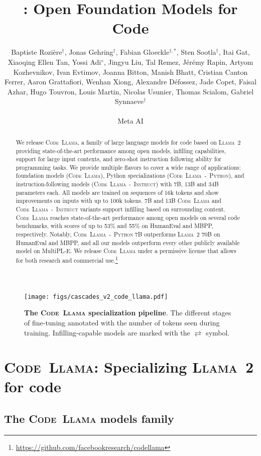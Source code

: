 \documentclass[10pt]{article}
\title{\model: Open Foundation Models for Code}
\author{\name Baptiste Rozi\`{e}re$^\dagger$,
Jonas Gehring$^\dagger$,
Fabian Gloeckle$^{\dagger,\ast}$, 
Sten Sootla$^\dagger$, 
Itai Gat, 
Xiaoqing Ellen Tan, 
Yossi Adi$^{\diamond}$, 
Jingyu Liu, 
Tal Remez, 
J\'{e}r\'{e}my Rapin,
Artyom Kozhevnikov, 
Ivan Evtimov, 
Joanna Bitton,
Manish Bhatt,
Cristian Canton Ferrer,
Aaron Grattafiori,
Wenhan Xiong, 
Alexandre D\'{e}fossez,
Jade Copet,
Faisal Azhar,
Hugo Touvron, 
Louis Martin, 
Nicolas Usunier,
Thomas Scialom,
Gabriel Synnaeve$^\dagger$
\\ \\
\hspace*{0pt}\hfill Meta AI
}
\newcommand{\model}{\textsc{Code~Llama}\xspace}
\newcommand{\basemodel}{\textsc{Code~Llama}\xspace}
\newcommand{\instmodel}{\textsc{Code~Llama~-~Instruct}\xspace}
\newcommand{\pymodel}{\textsc{Code~Llama~-~Python}\xspace}
\newcommand{\llamavtwo}{\textsc{Llama~2}\xspace}
\begin{document}
\maketitle

\begin{abstract}

We release \model, a family of large language models for code based on \llamavtwo providing state-of-the-art performance among open models, infilling capabilities, support for large input contexts, and zero-shot instruction following ability for programming tasks.
We provide multiple flavors to cover a wide range of applications: foundation models (\basemodel), Python specializations (\pymodel), and instruction-following models (\instmodel) with 7B, 13B and 34B parameters each.
All models are trained on sequences of 16k tokens and show improvements on inputs with up to 100k tokens.
7B and 13B \basemodel and \instmodel variants support infilling based on surrounding content.
\model reaches state-of-the-art performance among open models on several code benchmarks, with scores of up to 53\% and 55\% on HumanEval and MBPP, respectively.
Notably, \pymodel 7B outperforms \llamavtwo 70B on HumanEval and MBPP, and all our models outperform every other publicly available model on MultiPL-E.
We release \model under a permissive license that allows for both research and commercial use.\footnote{
\url{https://github.com/facebookresearch/codellama}}
\end{abstract}


\begin{figure}[t!]
    \centering
    \texttt{[image: figs/cascades\_v2\_code\_llama.pdf]}
    \caption{\textbf{The \model specialization pipeline}. 
    The different stages of fine-tuning annotated with the number of tokens seen during training.
    Infilling-capable models are marked with the $\rightleftarrows$ symbol.\label{fig:training_order}}
\end{figure}

\section{\model: Specializing \llamavtwo for code}
\label{sec:method}

\subsection{The \model models family}
\end{document}
